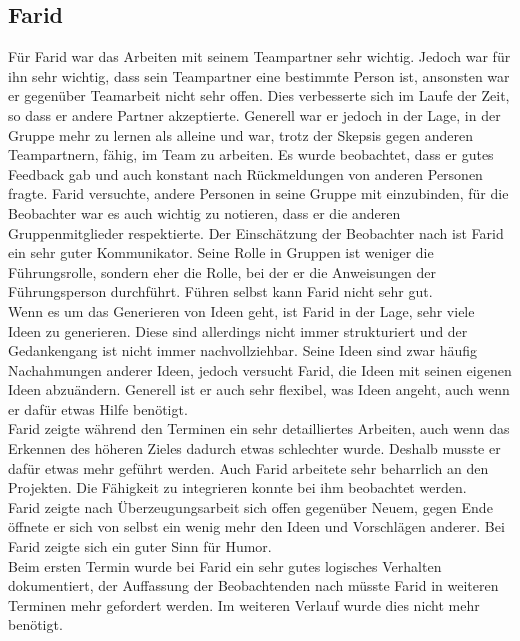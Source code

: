 \subsection*{Farid}
Für Farid war das Arbeiten mit seinem Teampartner sehr wichtig. Jedoch war für ihn sehr wichtig, dass sein Teampartner eine bestimmte Person ist, ansonsten war er gegenüber Teamarbeit nicht sehr offen. Dies verbesserte sich im Laufe der Zeit, so dass er andere Partner akzeptierte. Generell war er jedoch in der Lage, in der Gruppe mehr zu lernen als alleine und war, trotz der Skepsis gegen anderen Teampartnern, fähig, im Team zu arbeiten. Es wurde beobachtet, dass er gutes Feedback gab und auch konstant nach Rückmeldungen von anderen Personen fragte. Farid versuchte, andere Personen in seine Gruppe mit einzubinden, für die Beobachter war es auch wichtig zu notieren, dass er die anderen Gruppenmitglieder respektierte. Der Einschätzung der Beobachter nach ist Farid ein sehr guter Kommunikator. Seine Rolle in Gruppen ist weniger die Führungsrolle, sondern eher die Rolle, bei der er die Anweisungen der Führungsperson durchführt. Führen selbst kann Farid nicht sehr gut.\\

Wenn es um das Generieren von Ideen geht, ist Farid in der Lage, sehr viele Ideen zu generieren. Diese sind allerdings nicht immer strukturiert und der Gedankengang ist nicht immer nachvollziehbar. Seine Ideen sind zwar häufig Nachahmungen anderer Ideen, jedoch versucht Farid, die Ideen mit seinen eigenen Ideen abzuändern. Generell ist er auch sehr flexibel, was Ideen angeht, auch wenn er dafür etwas Hilfe benötigt.\\
Farid zeigte während den Terminen ein sehr detailliertes Arbeiten, auch wenn das Erkennen des höheren Zieles dadurch etwas schlechter wurde. Deshalb musste er dafür etwas mehr geführt werden. Auch Farid arbeitete sehr beharrlich an den Projekten. Die Fähigkeit zu integrieren konnte bei ihm beobachtet werden.\\
Farid zeigte nach Überzeugungsarbeit sich offen gegenüber Neuem, gegen Ende öffnete er sich von selbst ein wenig mehr den Ideen und Vorschlägen anderer. Bei Farid zeigte sich ein guter Sinn für Humor. \\
Beim ersten Termin wurde bei Farid ein sehr gutes logisches Verhalten dokumentiert, der Auffassung der Beobachtenden nach müsste Farid in weiteren Terminen mehr gefordert werden. Im weiteren Verlauf wurde dies nicht mehr benötigt.\\


